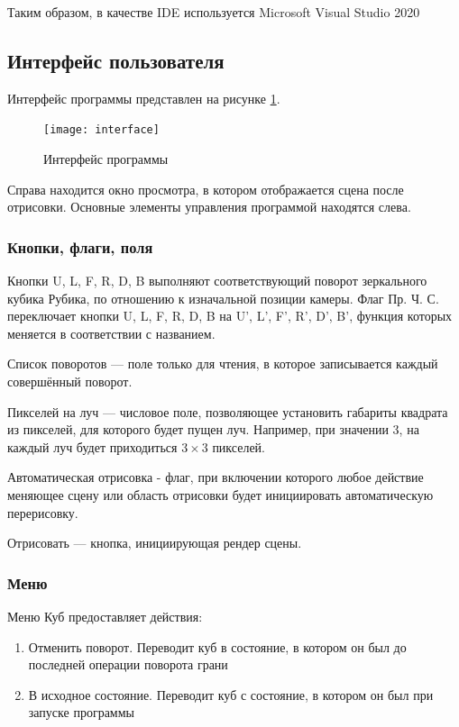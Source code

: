 Таким образом, в качестве IDE используется Microsoft Visual Studio 2020

\subsection{Интерфейс пользователя}
Интерфейс программы представлен на рисунке \ref{fig:interface}.

\begin{figure}[ht]
	\centering
	\texttt{[image: interface]}
	\caption{Интерфейс программы}
	\label{fig:interface}
\end{figure}

Справа находится окно просмотра, в котором отображается сцена после отрисовки. Основные элементы управления программой находятся слева.

\subsubsection{Кнопки, флаги, поля}
Кнопки U, L, F, R, D, B выполняют соответствующий поворот зеркального кубика Рубика, по отношению к изначальной позиции камеры. Флаг Пр. Ч. С. переключает кнопки U, L, F, R, D, B на U', L', F', R', D', B', функция которых меняется в соответствии с названием.

Список поворотов --- поле только для чтения, в которое записывается каждый совершённый поворот.

Пикселей на луч --- числовое поле, позволяющее установить габариты квадрата из пикселей, для которого будет пущен луч. Например, при значении 3, на каждый луч будет приходиться $3\times 3$ пикселей.

Автоматическая отрисовка - флаг, при включении которого любое действие меняющее сцену или область отрисовки будет инициировать автоматическую перерисовку.

Отрисовать --- кнопка, инициирующая рендер сцены.

\subsubsection{Меню}
Меню Куб предоставляет действия:
\begin{enumerate}
	\item Отменить поворот. Переводит куб в состояние, в котором он был до последней операции поворота грани
	\item В исходное состояние. Переводит куб с состояние, в котором он был при запуске программы
\end{enumerate}

